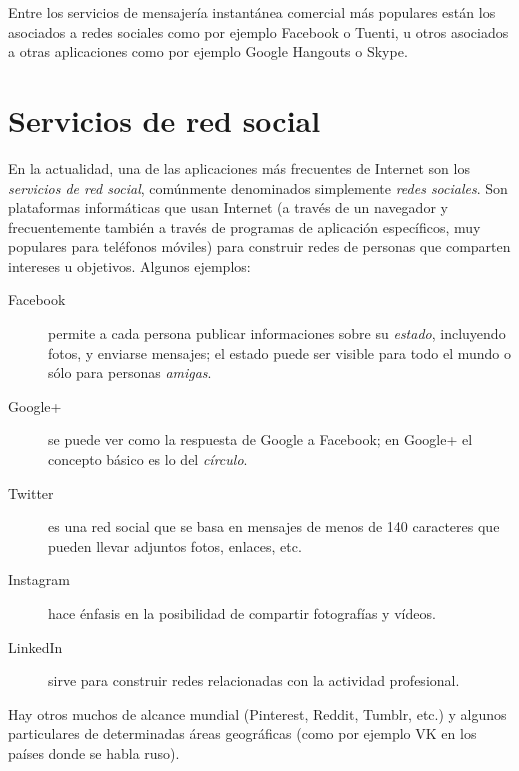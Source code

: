 Entre los servicios de mensajería instantánea comercial más populares están los asociados a redes sociales como por ejemplo Facebook o Tuenti, u otros asociados a otras aplicaciones como por ejemplo Google Hangouts o Skype. 

\section{Servicios de red social} \label{ss:xarsessocials} En la actualidad, una de las aplicaciones más frecuentes de Internet son los \emph{servicios de red social}, comúnmente denominados simplemente \emph{redes sociales}. Son plataformas informáticas que usan Internet (a través de un navegador y frecuentemente también a través de programas de aplicación específicos, muy populares para teléfonos móviles) para construir redes de personas que comparten intereses u objetivos. Algunos ejemplos: \begin{description} \item[Facebook] permite a cada persona publicar informaciones sobre su \emph{estado}, incluyendo fotos, y enviarse mensajes; el estado puede ser visible para todo el mundo o sólo para personas \emph{amigas}. \item[Google+] se puede ver como la respuesta de Google a Facebook; en Google+ el concepto básico es lo del \emph{círculo}. \item[Twitter] es una red social que se basa en mensajes de menos de 140 caracteres que pueden llevar adjuntos fotos, enlaces, etc. \item[Instagram] hace énfasis en la posibilidad de compartir fotografías y vídeos. \item[LinkedIn] sirve para construir redes relacionadas con la actividad profesional. \end{description} Hay otros muchos de alcance mundial (Pinterest, Reddit, Tumblr, etc.) y algunos particulares de determinadas áreas geográficas (como por ejemplo VK en los países donde se habla ruso). 

